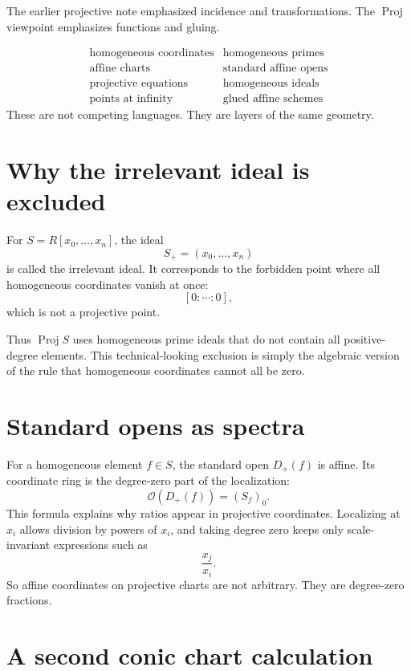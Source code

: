 The earlier projective note emphasized incidence and transformations. The \(\operatorname{Proj}\) viewpoint emphasizes functions and gluing.

\[
\begin{array}{c|c}
\text{homogeneous coordinates} & \text{homogeneous primes}\\
\text{affine charts} & \text{standard affine opens}\\
\text{projective equations} & \text{homogeneous ideals}\\
\text{points at infinity} & \text{glued affine schemes}
\end{array}
\]
These are not competing languages. They are layers of the same geometry.


\section{Why the irrelevant ideal is excluded}

For \(S=R[x_0,\ldots,x_n]\), the ideal
\[
  S_+=(x_0,\ldots,x_n)
\]
is called the irrelevant ideal.  It corresponds to the forbidden point where all homogeneous coordinates vanish at once:
\[
  [0:\cdots:0],
\]
which is not a projective point.

Thus \(\operatorname{Proj}S\) uses homogeneous prime ideals that do not contain all positive-degree elements.  This technical-looking exclusion is simply the algebraic version of the rule that homogeneous coordinates cannot all be zero.

\section{Standard opens as spectra}

For a homogeneous element \(f\in S\), the standard open \(D_+(f)\) is affine.  Its coordinate ring is the degree-zero part of the localization:
\[
  \mathcal O(D_+(f))=(S_f)_0.
\]
This formula explains why ratios appear in projective coordinates.  Localizing at \(x_i\) allows division by powers of \(x_i\), and taking degree zero keeps only scale-invariant expressions such as
\[
  \frac{x_j}{x_i}.
\]
So affine coordinates on projective charts are not arbitrary.  They are degree-zero fractions.

\section{A second conic chart calculation}

